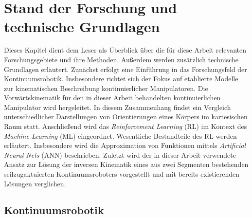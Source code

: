 \chapter{Stand der Forschung und technische Grundlagen}

Dieses Kapitel dient dem Leser als Überblick über die für diese Arbeit relevanten Forschungsgebiete und ihre Methoden. Außerdem werden zusätzlich technische Grundlagen erläutert. Zunächst erfolgt eine Einführung in das Forschungsfeld der Kontinuumsrobotik. Insbesondere richtet sich der Fokus auf etablierte Modelle zur kinematischen Beschreibung kontinuierlicher Manipulatoren. Die Vorwärtskinematik für den in dieser Arbeit behandelten kontinuierlichen Manipulator wird hergeleitet.
In diesem Zusammenhang findet ein Vergleich unterschiedlicher Darstellungen von Orientierungen eines Körpers im kartesischen Raum statt. 
Anschließend wird das \textit{Reinforcement Learning} (RL) im Kontext des \textit{Machine Learning} (ML) eingeordnet. Wesentliche Bestandteile des RL werden erläutert. Insbesondere wird die Approximation von Funktionen mittels \textit{Artificial Neural Nets} (ANN) beschrieben. 
Zuletzt wird der in dieser Arbeit verwendete Ansatz zur Lösung der inversen Kinematik eines aus zwei Segmenten bestehenden seilzugaktuierten Kontinuumsroboters vorgestellt und mit bereits existierenden Lösungen verglichen.

\section{Kontinuumsrobotik}
\label{sec:kontinuumsrobotik}

